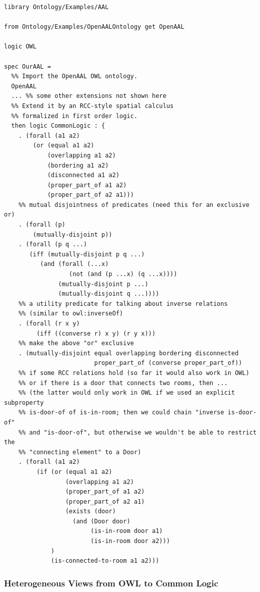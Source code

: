 \documentclass{article}
\begin{document}
\begin{lstlisting}[language=HetCASL,basicstyle={\small\ttfamily},morekeywords={exists,forall,or,iff,not,if},alsoletter={-}]
library Ontology/Examples/AAL

from Ontology/Examples/OpenAALOntology get OpenAAL

logic OWL

spec OurAAL =
  %% Import the OpenAAL OWL ontology.
  OpenAAL
  ... %% some other extensions not shown here
  %% Extend it by an RCC-style spatial calculus
  %% formalized in first order logic.
  then logic CommonLogic : {
    . (forall (a1 a2)
        (or (equal a1 a2)
            (overlapping a1 a2)
            (bordering a1 a2)
            (disconnected a1 a2)
            (proper_part_of a1 a2)
            (proper_part_of a2 a1)))
    %% mutual disjointness of predicates (need this for an exclusive or)
    . (forall (p)
        (mutually-disjoint p))
    . (forall (p q ...)
       (iff (mutually-disjoint p q ...)
          (and (forall (...x)
                  (not (and (p ...x) (q ...x))))
               (mutually-disjoint p ...)
               (mutually-disjoint q ...))))
    %% a utility predicate for talking about inverse relations
    %% (similar to owl:inverseOf)
    . (forall (r x y)
         (iff ((converse r) x y) (r y x)))
    %% make the above "or" exclusive
    . (mutually-disjoint equal overlapping bordering disconnected
                         proper_part_of (converse proper_part_of))
    %% if some RCC relations hold (so far it would also work in OWL)
    %% or if there is a door that connects two rooms, then ...
    %% (the latter would only work in OWL if we used an explicit subproperty
    %% is-door-of of is-in-room; then we could chain "inverse is-door-of"
    %% and "is-door-of", but otherwise we wouldn't be able to restrict the
    %% "connecting element" to a Door)
    . (forall (a1 a2)
         (if (or (equal a1 a2)
                 (overlapping a1 a2)
                 (proper_part_of a1 a2)
                 (proper_part_of a2 a1)
                 (exists (door)
                   (and (Door door)
                        (is-in-room door a1)
                        (is-in-room door a2)))
             )
             (is-connected-to-room a1 a2)))
\end{lstlisting}

\subsubsection{Heterogeneous Views from OWL to Common Logic}
\label{sec:heter-views-from}
\end{document}
